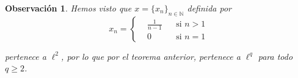 \documentclass{article}
\newcommand{\N}{\mathbb{N}}
\newcommand{\twodef}[4]{\left\{ \begin{aligned}
						&#1	&&\text{si } #2	\\
						&#3	&&\text{si } #4
					\end{aligned} \right. }
\newtheorem{obst}{Observación}[teo]
\begin{document}
\begin{obst} Hemos visto que $x = \{x_{n}\}_{n \in \N}$ definida por
	$$x_{n} = \twodef	{\frac{1}{n-1}} {n > 1}
					{0}{n = 1}$$

pertenece a $\ell^{2}$, por lo que por el teorema anterior, pertenece a $\ell^{q}$ para todo $q \geq 2$.
\end{obst}
\end{document}
